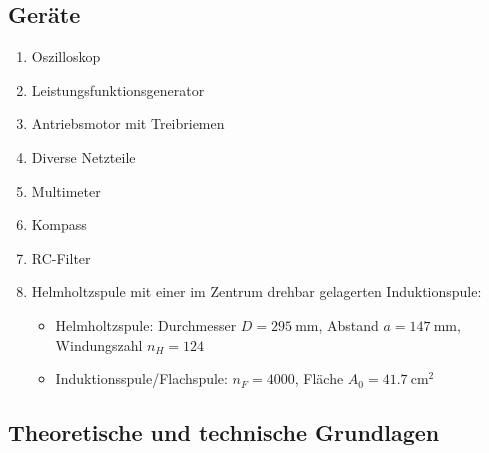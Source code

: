 \subsection{Geräte}
\begin{enumerate} 
\item Oszilloskop
\item Leistungsfunktionsgenerator
\item Antriebsmotor mit Treibriemen
\item Diverse Netzteile
\item Multimeter
\item Kompass
\item RC-Filter
\item Helmholtzspule mit einer im Zentrum drehbar gelagerten Induktionspule: \begin{itemize}
    \item Helmholtzspule: Durchmesser \(D=\qty{295}{\milli\m}\), Abstand \(a=\qty{147}{\milli\m}\), Windungszahl \(n_H=\num{124}\)
    \item Induktionsspule/Flachspule: \(n_F=\num{4000}\), Fläche \(A_0=\qty{41.7}{\cm\squared}\)
\end{itemize}
\end{enumerate}

\newpage

\subsection[Theoretische und technische Grundlagen]{Theoretische und technische Grundlagen \protect\autocite{Skript_2.2}}
